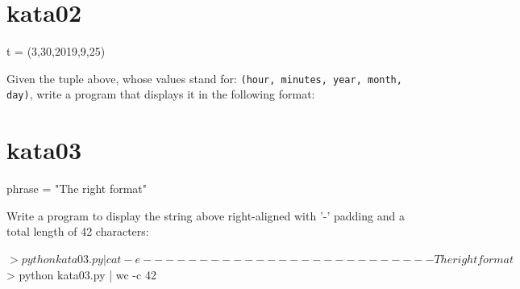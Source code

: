 \documentclass{42-en}
\begin{document}
\section*{kata02}
\begin{42console} %
	t = (3,30,2019,9,25)
\end{42console}

Given the tuple above, whose values stand for: \texttt{(hour, minutes, year, month, day)}, 
write a program that displays it in the following format:


\section*{kata03}
\begin{42console} %
	phrase = "The right format"
\end{42console}

Write a program to display the string above right-aligned with '-' 
padding and a total length of 42 characters:

\begin{42console}
	$> python kata03.py | cat -e
	--------------------------The right format%
	$> python kata03.py | wc -c
    42
\end{42console}
\end{document}
